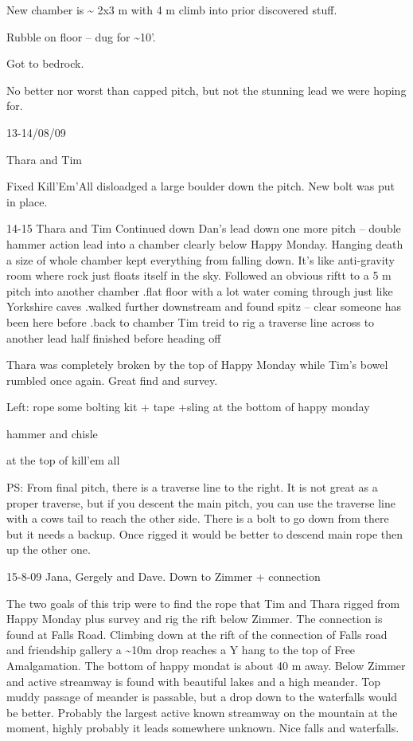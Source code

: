 New chamber is \textasciitilde{} 2x3 m with 4 m climb into prior
discovered stuff.

Rubble on floor -- dug for \textasciitilde{}10'.

Got to bedrock.

No better nor worst than capped pitch, but not the stunning lead we were
hoping for.

13-14/08/09

Thara and Tim

Fixed Kill'Em'All disloadged a large boulder down the pitch. New bolt
was put in place.

14-15 Thara and Tim Continued down Dan's lead down one more pitch --
double hammer action lead into a chamber clearly below Happy Monday.
Hanging death a size of whole chamber kept everything from falling down.
It's like anti-gravity room where rock just floats itself in the sky.
Followed an obvious riftt to a 5 m pitch into another chamber .flat
floor with a lot water coming through just like Yorkshire caves .walked
further downstream and found spitz -- clear someone has been here before
.back to chamber Tim treid to rig a traverse line across to another lead
half finished before heading off

Thara was completely broken by the top of Happy Monday while Tim's bowel
rumbled once again. Great find and survey.

Left: rope some bolting kit + tape +sling at the bottom of happy monday

hammer and chisle

at the top of kill'em all

PS: From final pitch, there is a traverse line to the right. It is not
great as a proper traverse, but if you descent the main pitch, you can
use the traverse line with a cows tail to reach the other side. There is
a bolt to go down from there but it needs a backup. Once rigged it would
be better to descend main rope then up the other one.

15-8-09 Jana, Gergely and Dave. Down to Zimmer + connection

The two goals of this trip were to find the rope that Tim and Thara
rigged from Happy Monday plus survey and rig the rift below Zimmer. The
connection is found at Falls Road. Climbing down at the rift of the
connection of Falls road and friendship gallery a \textasciitilde{}10m
drop reaches a Y hang to the top of Free Amalgamation. The bottom of
happy mondat is about 40 m away. Below Zimmer and active streamway is
found with beautiful lakes and a high meander. Top muddy passage of
meander is passable, but a drop down to the waterfalls would be better.
Probably the largest active known streamway on the mountain at the
moment, highly probably it leads somewhere unknown. Nice falls and
waterfalls.

